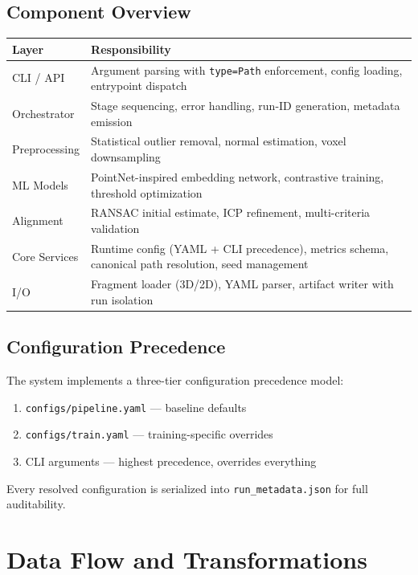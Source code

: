 \documentclass[11pt,a4paper]{article}
\begin{document}
\subsection{Component Overview}

\begin{tabularx}{\textwidth}{lX}
\toprule
\textbf{Layer} & \textbf{Responsibility} \\
\midrule
CLI / API & Argument parsing with \texttt{type=Path} enforcement, config loading, entrypoint dispatch \\
Orchestrator & Stage sequencing, error handling, run-ID generation, metadata emission \\
Preprocessing & Statistical outlier removal, normal estimation, voxel downsampling \\
ML Models & PointNet-inspired embedding network, contrastive training, threshold optimization \\
Alignment & RANSAC initial estimate, ICP refinement, multi-criteria validation \\
Core Services & Runtime config (YAML + CLI precedence), metrics schema, canonical path resolution, seed management \\
I/O & Fragment loader (3D/2D), YAML parser, artifact writer with run isolation \\
\bottomrule
\end{tabularx}

\subsection{Configuration Precedence}

The system implements a three-tier configuration precedence model:
\begin{enumerate}
    \item \texttt{configs/pipeline.yaml} — baseline defaults
    \item \texttt{configs/train.yaml} — training-specific overrides
    \item CLI arguments — highest precedence, overrides everything
\end{enumerate}

Every resolved configuration is serialized into \texttt{run\_metadata.json} for full auditability.

\section{Data Flow and Transformations}
\end{document}
